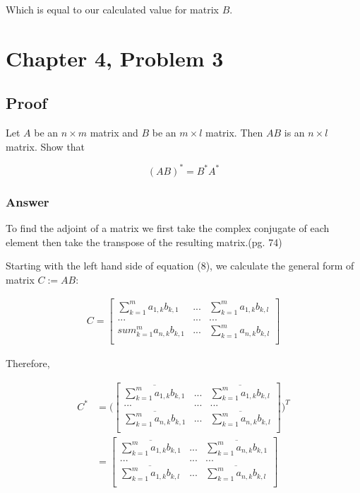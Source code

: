 \documentclass{article}
\begin{document}
		Which is equal to our calculated value for matrix $B$.
		
	\section{Chapter 4, Problem 3}
		\subsection{Proof}
		Let $A$ be an $n\times m$ matrix and $B$ be an $m\times l$ matrix.  Then $AB$ is an $n\times l$ matrix.  Show that 
		
		\begin{equation}
			(AB)^*=B^*A^*
		\end{equation}
		
		\subsubsection{Answer}
		
		To find the adjoint of a matrix we first take the complex conjugate of each element then take the transpose of the resulting matrix.\cite{BG}(pg. 74)
		
		Starting with the left hand side of equation (8), we calculate the general form of matrix $C:=AB$:
		
		\begin{align*}
		C=
			\begin{bmatrix}
			\sum_{k=1}^{m}a_{1,k}b_{k,1}&...&\sum_{k=1}^{m}a_{1,k}b_{k,l}\\
			...&...&...\\
			sum_{k=1}^{m}a_{n,k}b_{k,1}&...&\sum_{k=1}^{m}a_{n,k}b_{k,l}\\
			\end{bmatrix}
		\end{align*}
		
		Therefore,
		
		\begin{align*}
			C^{*}&=\Bigg(
				\begin{bmatrix}
				\overline{\sum_{k=1}^{m}a_{1,k}b_{k,1}}&...&\overline{\sum_{k=1}^{m}a_{1,k}b_{k,l}}\\
				...&...&...\\
				\overline{\sum_{k=1}^{m}a_{n,k}b_{k,1}}&...&\overline{\sum_{k=1}^{m}a_{n,k}b_{k,l}}\\
				\end{bmatrix}\Bigg)^{T}\\
				&=
				\begin{bmatrix}
				\overline{\sum_{k=1}^{m}a_{1,k}b_{k,1}}&...&\overline{\sum_{k=1}^{m}a_{n,k}b_{k,1}}\\
				...&...&...\\
				\overline{\sum_{k=1}^{m}a_{1,k}b_{k,l}}&...&\overline{\sum_{k=1}^{m}a_{n,k}b_{k,l}}\\
				\end{bmatrix}
		\end{align*}
		
\end{document}
